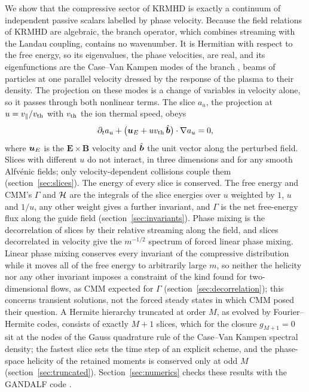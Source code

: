 We show that the compressive sector of KRMHD is exactly a continuum of independent passive scalars labelled by phase velocity. Because the field relations of KRMHD are algebraic, the branch operator, which combines streaming with the Landau coupling, contains no wavenumber. It is Hermitian with respect to the free energy, so its eigenvalues, the phase velocities, are real, and its eigenfunctions are the Case--Van Kampen modes of the branch \citep{vanKampen1955,Case1959}, beams of particles at one parallel velocity dressed by the response of the plasma to their density. The projection on these modes is a change of variables in velocity alone, so it passes through both nonlinear terms. The slice $a_u$, the projection at $u=v_\parallel/v_{\mathrm{th}}$ with $v_{\mathrm{th}}$ the ion thermal speed, obeys
\begin{equation*}
  \partial_ta_u+\big(\boldsymbol u_E+uv_{\mathrm{th}}\,\hat{\boldsymbol b}\big)\cdot\nabla a_u=0,
\end{equation*}
where $\boldsymbol u_E$ is the $\boldsymbol E\times\boldsymbol B$ velocity and $\hat{\boldsymbol b}$ the unit vector along the perturbed field. Slices with different $u$ do not interact, in three dimensions and for any smooth Alfv\'enic fields; only velocity-dependent collisions couple them (section~\ref{sec:slices}). The energy of every slice is conserved. The free energy and CMM's $\Gamma$ and $\mathcal H$ are the integrals of the slice energies over $u$ weighted by $1$, $u$ and $1/u$, any other weight gives a further invariant, and $\Gamma$ is the net free-energy flux along the guide field (section~\ref{sec:invariants}). Phase mixing is the decorrelation of slices by their relative streaming along the field, and slices decorrelated in velocity give the $m^{-1/2}$ spectrum of forced linear phase mixing. Linear phase mixing conserves every invariant of the compressive distribution while it moves all of the free energy to arbitrarily large $m$, so neither the helicity nor any other invariant imposes a constraint of the kind \citet{Fjortoft1953} found for two-dimensional flows, as CMM expected for $\Gamma$ (section~\ref{sec:decorrelation}); this concerns transient solutions, not the forced steady states in which CMM posed their question. A Hermite hierarchy truncated at order $M$, as evolved by Fourier--Hermite codes, consists of exactly $M+1$ slices, which for the closure $g_{M+1}=0$ sit at the nodes of the Gauss quadrature rule of the Case--Van Kampen spectral density; the fastest slice sets the time step of an explicit scheme, and the phase-space helicity of the retained moments is conserved only at odd $M$ (section~\ref{sec:truncated}). Section~\ref{sec:numerics} checks these results with the GANDALF code \citep{Kanekar2025}.


